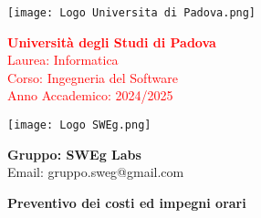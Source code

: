 \begin{minipage}{0.4\textwidth}
    \texttt{[image: Logo Universita di Padova.png]}
\end{minipage}
\begin{minipage}{0.55\textwidth}
    \textcolor{red}{\textbf{Università degli Studi di Padova}} \\
    \textcolor{red}{Laurea: Informatica} \\
    \textcolor{red}{Corso: Ingegneria del Software} \\
    \textcolor{red}{Anno Accademico: 2024/2025}
\end{minipage}

\begin{minipage}{0.4\textwidth}
    \texttt{[image: Logo SWEg.png]}
\end{minipage}
\begin{minipage}{0.55\textwidth}
    \textbf{Gruppo: SWEg Labs} \\
    Email: \textsf{gruppo.sweg@gmail.com}
\end{minipage}

\vspace{2cm}

{
\centering
\Huge\bfseries Preventivo dei costi ed impegni orari\par
}

\vspace{2cm}